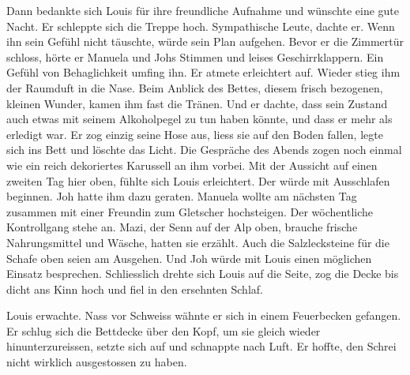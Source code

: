 Dann bedankte sich Louis für ihre freundliche Aufnahme und wünschte eine
gute Nacht. Er schleppte sich die Treppe hoch. Sympathische Leute,
dachte er. Wenn ihn sein Gefühl nicht täuschte, würde sein Plan
aufgehen.
Bevor er die Zimmertür schloss, hörte er Manuela und Johs Stimmen und
leises Geschirrklappern. Ein Gefühl von Behaglichkeit umfing
ihn. Er atmete erleichtert auf. Wieder stieg ihm der Raumduft in die
Nase. Beim Anblick des Bettes, diesem frisch bezogenen, kleinen Wunder,
kamen ihm fast die Tränen. Und er dachte, dass sein Zustand auch etwas
mit seinem Alkoholpegel zu tun haben könnte, und dass er mehr als
erledigt war. Er zog einzig seine Hose aus, liess sie auf den Boden fallen, legte sich ins Bett und löschte das Licht.
Die Gespräche des Abends zogen noch einmal wie ein reich dekoriertes
Karussell an ihm vorbei. Mit der Aussicht auf einen zweiten Tag hier
oben, fühlte sich Louis erleichtert. Der würde mit Ausschlafen beginnen.
Joh hatte ihm dazu geraten.
Manuela wollte am nächsten Tag zusammen mit einer Freundin zum Gletscher
hochsteigen. Der wöchentliche Kontrollgang stehe an. Mazi, der Senn auf
der Alp oben, brauche frische Nahrungsmittel und Wäsche, hatten sie
erzählt. Auch die Salzlecksteine für die Schafe oben seien am Ausgehen.
Und Joh würde mit Louis einen möglichen Einsatz besprechen.
Schliesslich drehte sich Louis auf die Seite, zog die Decke bis dicht
ans Kinn hoch und fiel in den ersehnten Schlaf.

\sectionbreak


\sectionbreak

Louis erwachte. Nass vor Schweiss wähnte er sich in einem Feuerbecken 
gefangen. Er schlug sich die Bettdecke über den Kopf, um sie gleich
wieder hinunterzureissen, setzte sich auf und schnappte nach Luft. Er
hoffte, den Schrei nicht wirklich ausgestossen zu haben.
